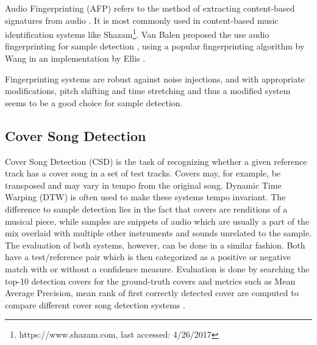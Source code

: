 \documentclass{article}
\begin{document}
Audio Fingerprinting (AFP) refers to the method of extracting content-based signatures from audio \cite{cano2005review,haitsma2002highly,baluja2007audio}. It is most commonly used in content-based music identification systems like Shazam\footnote{https://www.shazam.com, last accessed: 4/26/2017}.
Van Balen proposed the use audio fingerprinting for sample detection \cite{van2011automatic,van2012automatic}, using a popular fingerprinting algorithm by Wang \cite{wang2003industrial} in an implementation by Ellis \cite{ellisfinger}. 


Fingerprinting systems are robust against noise injections, and with appropriate modifications, pitch shifting and time stretching \cite{zhu2010novel} and thus a modified system seems to be a good choice for sample detection.

\subsection{Cover Song Detection}
Cover Song Detection (CSD) is the task of recognizing whether a given reference track has a cover song in a set of test tracks\cite{Ellis2007Cover,ravuri2010cover,bertin2011large}.
Covers may, for example, be transposed and may vary in tempo from the original song. Dynamic Time Warping (DTW) \cite{sakoe1978dynamic} is often used to make these systems tempo invariant. The difference to sample detection lies in the fact that covers are renditions of a musical piece, while samples are snippets of audio which are usually a part of the mix overlaid with multiple other instruments and sounds unrelated to the sample.
%
The evaluation of both systems, however, can be done in a similar fashion. Both have a test/reference pair which is then categorized as a positive or negative match with or without a confidence measure. Evaluation is done by searching the top-10 detection covers for the ground-truth covers and metrics such as Mean Average Precision, mean rank of first correctly detected cover are computed to compare different cover song detection systems \cite{serracover,serra2007cover}.
\end{document}
